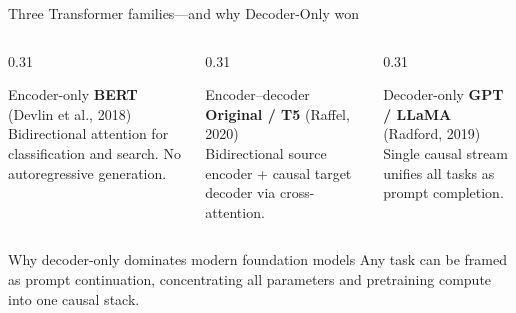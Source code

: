 \documentclass[handout]{beamer}
\begin{document}
\begin{frame}{Three Transformer families---and why Decoder-Only won}
  \begin{columns}[t]
    \begin{column}{0.31\linewidth}
      \begin{block}{Encoder-only}
        \footnotesize
        \textbf{BERT} (Devlin et al., 2018)\\[2pt]
        Bidirectional attention for classification and search. No autoregressive generation.
      \end{block}
    \end{column}
    \begin{column}{0.31\linewidth}
      \begin{block}{Encoder--decoder}
        \footnotesize
        \textbf{Original / T5} (Raffel, 2020)\\[2pt]
        Bidirectional source encoder + causal target decoder via cross-attention.
      \end{block}
    \end{column}
    \begin{column}{0.31\linewidth}
      \begin{block}{Decoder-only}
        \footnotesize
        \textbf{GPT / LLaMA} (Radford, 2019)\\[2pt]
        Single causal stream unifies all tasks as prompt completion.
      \end{block}
    \end{column}
  \end{columns}
  \begin{alertblock}{Why decoder-only dominates modern foundation models}
    \small Any task can be framed as prompt continuation, concentrating all parameters and pretraining compute into one causal stack.
  \end{alertblock}
\end{frame}
\end{document}

